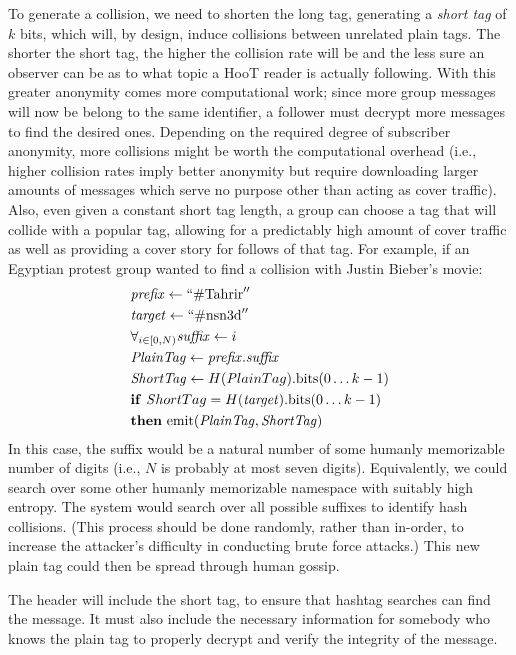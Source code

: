 To generate a collision, we need to shorten the long tag, generating a \textit{short tag} of $k$ bits, which will, by design, induce collisions between unrelated plain tags. The shorter the short tag, the higher the collision rate will be and the less sure an observer can be as to what topic a HooT reader is actually following. With this greater anonymity comes more computational work; since more group messages will now be belong to the same identifier, a follower must decrypt more messages to find the desired ones. Depending on the required degree of subscriber anonymity, more collisions might be worth the computational overhead (i.e., higher collision rates imply better anonymity but require downloading larger amounts of messages which serve no purpose other than acting as cover traffic). Also, even given a constant short tag length, a group can choose a tag that will collide with a popular tag, allowing for a predictably high amount of cover traffic as well as providing a cover story for follows of that tag. For example, if an Egyptian protest group wanted to find a collision with Justin Bieber's movie:
%
\begin{align*}
& \mathit{prefix} \leftarrow  ``\mathrm{\#Tahrir}'' \\
& \mathit{target} \leftarrow ``\mathrm{\#nsn3d}'' \\
& \forall_{i \in [0, N)}  \mathit{suffix} \leftarrow i \\
& \mathit{PlainTag} \leftarrow  \mathit{prefix}.\mathit{suffix} \\
& \mathit{ShortTag} \leftarrow H({\mathit PlainTag}).\mathrm{bits}(0 \ldots k-1) \\
& \mathbf{if}\ {\mathit ShortTag} = H(\mathit{target}).\mathrm{bits}(0 \ldots k-1)\\
& \mathbf{then}\ \mathrm{emit} (\mathit{PlainTag} , {\mathit{ShortTag}}) 
\end{align*}
%
In this case, the suffix would be a natural number of some humanly memorizable number of digits (i.e., $N$ is probably at most seven digits). Equivalently, we could search over some other humanly memorizable namespace with suitably high entropy. The system would search over all possible suffixes to identify hash collisions. (This process should be done randomly, rather than in-order, to increase the attacker's difficulty in conducting brute force attacks.) This new plain tag could then be spread through human gossip.

The header will include the short tag, to ensure that hashtag searches can find the message. It must also include the necessary information for somebody who knows the plain tag to properly decrypt and verify the integrity of the message. 

